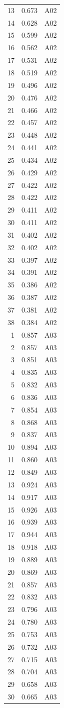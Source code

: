\begin{tabular}{rrl}
13 & 0.673 & A02 \\
14 & 0.628 & A02 \\
15 & 0.599 & A02 \\
16 & 0.562 & A02 \\
17 & 0.531 & A02 \\
18 & 0.519 & A02 \\
19 & 0.496 & A02 \\
20 & 0.476 & A02 \\
21 & 0.466 & A02 \\
22 & 0.457 & A02 \\
23 & 0.448 & A02 \\
24 & 0.441 & A02 \\
25 & 0.434 & A02 \\
26 & 0.429 & A02 \\
27 & 0.422 & A02 \\
28 & 0.422 & A02 \\
29 & 0.411 & A02 \\
30 & 0.411 & A02 \\
31 & 0.402 & A02 \\
32 & 0.402 & A02 \\
33 & 0.397 & A02 \\
34 & 0.391 & A02 \\
35 & 0.386 & A02 \\
36 & 0.387 & A02 \\
37 & 0.381 & A02 \\
38 & 0.384 & A02 \\
1 & 0.857 & A03 \\
2 & 0.857 & A03 \\
3 & 0.851 & A03 \\
4 & 0.835 & A03 \\
5 & 0.832 & A03 \\
6 & 0.836 & A03 \\
7 & 0.854 & A03 \\
8 & 0.868 & A03 \\
9 & 0.837 & A03 \\
10 & 0.894 & A03 \\
11 & 0.860 & A03 \\
12 & 0.849 & A03 \\
13 & 0.924 & A03 \\
14 & 0.917 & A03 \\
15 & 0.926 & A03 \\
16 & 0.939 & A03 \\
17 & 0.944 & A03 \\
18 & 0.918 & A03 \\
19 & 0.889 & A03 \\
20 & 0.869 & A03 \\
21 & 0.857 & A03 \\
22 & 0.832 & A03 \\
23 & 0.796 & A03 \\
24 & 0.780 & A03 \\
25 & 0.753 & A03 \\
26 & 0.732 & A03 \\
27 & 0.715 & A03 \\
28 & 0.704 & A03 \\
29 & 0.658 & A03 \\
30 & 0.665 & A03 \\
\bottomrule
\end{tabular}
